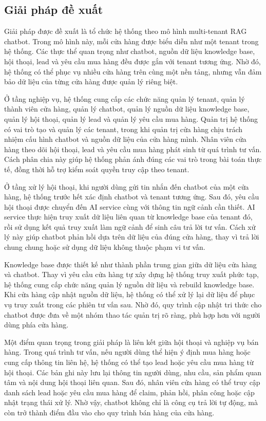 \documentclass[../DoAn.tex]{subfiles}
\begin{document}
\subsection{Giải pháp đề xuất}
\label{subsection:5.1.2}

Giải pháp được đề xuất là tổ chức hệ thống theo mô hình multi-tenant RAG chatbot. Trong mô hình này, mỗi cửa hàng được biểu diễn như một tenant trong hệ thống. Các thực thể quan trọng như chatbot, nguồn dữ liệu knowledge base, hội thoại, lead và yêu cầu mua hàng đều được gắn với tenant tương ứng. Nhờ đó, hệ thống có thể phục vụ nhiều cửa hàng trên cùng một nền tảng, nhưng vẫn đảm bảo dữ liệu của từng cửa hàng được quản lý riêng biệt.

Ở tầng nghiệp vụ, hệ thống cung cấp các chức năng quản lý tenant, quản lý thành viên cửa hàng, quản lý chatbot, quản lý nguồn dữ liệu knowledge base, quản lý hội thoại, quản lý lead và quản lý yêu cầu mua hàng. Quản trị hệ thống có vai trò tạo và quản lý các tenant, trong khi quản trị cửa hàng chịu trách nhiệm cấu hình chatbot và nguồn dữ liệu của cửa hàng mình. Nhân viên cửa hàng theo dõi hội thoại, lead và yêu cầu mua hàng phát sinh từ quá trình tư vấn. Cách phân chia này giúp hệ thống phản ánh đúng các vai trò trong bài toán thực tế, đồng thời hỗ trợ kiểm soát quyền truy cập theo tenant.

Ở tầng xử lý hội thoại, khi người dùng gửi tin nhắn đến chatbot của một cửa hàng, hệ thống trước hết xác định chatbot và tenant tương ứng. Sau đó, yêu cầu hội thoại được chuyển đến AI service cùng với thông tin ngữ cảnh cần thiết. AI service thực hiện truy xuất dữ liệu liên quan từ knowledge base của tenant đó, rồi sử dụng kết quả truy xuất làm ngữ cảnh để sinh câu trả lời tư vấn. Cách xử lý này giúp chatbot phản hồi dựa trên dữ liệu của đúng cửa hàng, thay vì trả lời chung chung hoặc sử dụng dữ liệu không thuộc phạm vi tư vấn.

Knowledge base được thiết kế như thành phần trung gian giữa dữ liệu cửa hàng và chatbot. Thay vì yêu cầu cửa hàng tự xây dựng hệ thống truy xuất phức tạp, hệ thống cung cấp chức năng quản lý nguồn dữ liệu và rebuild knowledge base. Khi cửa hàng cập nhật nguồn dữ liệu, hệ thống có thể xử lý lại dữ liệu để phục vụ truy xuất trong các phiên tư vấn sau. Nhờ đó, quy trình cập nhật tri thức cho chatbot được đưa về một nhóm thao tác quản trị rõ ràng, phù hợp hơn với người dùng phía cửa hàng.

Một điểm quan trọng trong giải pháp là liên kết giữa hội thoại và nghiệp vụ bán hàng. Trong quá trình tư vấn, nếu người dùng thể hiện ý định mua hàng hoặc cung cấp thông tin liên hệ, hệ thống có thể tạo lead hoặc yêu cầu mua hàng từ hội thoại. Các bản ghi này lưu lại thông tin người dùng, nhu cầu, sản phẩm quan tâm và nội dung hội thoại liên quan. Sau đó, nhân viên cửa hàng có thể truy cập danh sách lead hoặc yêu cầu mua hàng để claim, phản hồi, phân công hoặc cập nhật trạng thái xử lý. Nhờ vậy, chatbot không chỉ là công cụ trả lời tự động, mà còn trở thành điểm đầu vào cho quy trình bán hàng của cửa hàng.
\end{document}
